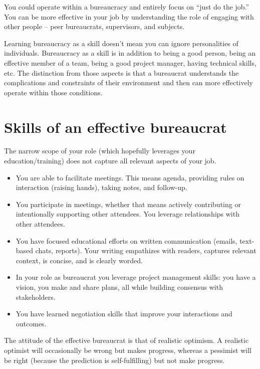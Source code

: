 You could operate within a bureaucracy and entirely focus on ``just do the job.'' You can be more effective in your job by understanding the role of engaging with other people -- peer bureaucrats, supervisors, and subjects. %

Learning bureaucracy as a skill doesn't mean you can ignore personalities of individuals. Bureaucracy as a skill is in addition to being a good person, being an effective member of a team, being a good project manager, having technical skills, etc. The distinction from those aspects is that a bureaucrat understands the complications and constraints of their environment and then can more effectively operate within those conditions.


\section{Skills of an effective bureaucrat}

The narrow scope of your role (which hopefully leverages your education/training) does not capture all relevant aspects of your job. 
\begin{itemize}
    \item You are able to facilitate meetings. This means agenda, providing rules on interaction (raising hands), taking notes, and follow-up.
    \item You participate in meetings, whether that means actively contributing or intentionally supporting other attendees. You leverage relationships with other attendees. 
    \item You have focused educational efforts on written communication (emails, text-based chats, reports). Your writing empathizes with readers, captures relevant context, is concise, and is clearly worded.
    \item In your role as bureaucrat you leverage project management skills: you have a vision, you make and share plans, all while building consensus with stakeholders.
    \item You have learned negotiation skills \cite{1982_Cohen} that improve your interactions and outcomes.
\end{itemize}

The attitude of the effective bureaucrat  is that of realistic optimism. A realistic optimist will occasionally be wrong but makes progress, whereas a pessimist will be right (because the prediction is self-fulfilling) but not make progress.
